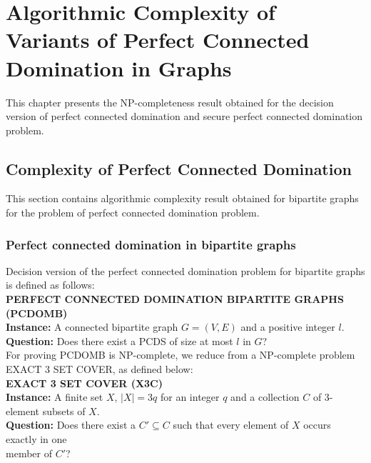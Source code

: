 \chapter{Algorithmic Complexity of Variants of Perfect Connected Domination in Graphs} 
\noindent
This chapter presents the NP-completeness result obtained for the decision version of perfect connected domination and secure perfect connected domination problem.
\section{Complexity of Perfect Connected Domination}
\noindent
This section contains algorithmic complexity result obtained for bipartite graphs for the problem of perfect connected domination problem.
\subsection{Perfect connected domination in bipartite graphs}
\noindent  
Decision version of the perfect connected domination problem for bipartite graphs is defined as follows:\\
\textbf{PERFECT CONNECTED DOMINATION BIPARTITE GRAPHS (PCDOMB)}\\
\indent \textbf{Instance:} A connected bipartite graph $G=(V,E)$ and a positive integer $l$.\\
\indent \textbf{Question:} Does there exist a PCDS of size at most $l$ in $G$?\\
For proving PCDOMB is NP-complete, we reduce from a NP-complete problem EXACT 3 SET COVER, as defined below:\\
\textbf{EXACT 3 SET COVER (X3C)}\\
\indent \textbf{Instance:} A finite set $X$, $|X|=3q$ for an integer $q$ and a collection $C$ of 3-element subsets of $X$.\\
\indent \textbf{Question:} Does there exist a $C' \subseteq C$ such that every element of $X$ occurs exactly in one \\ 
\indent \indent \indent \indent   \hspace{1ex} member of $C'$?

